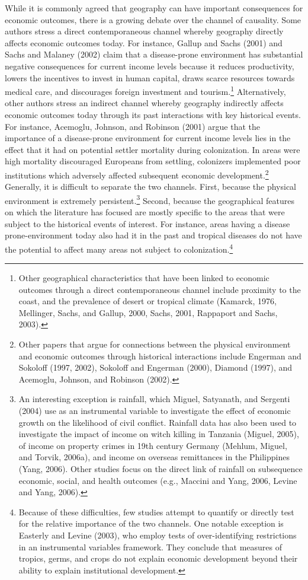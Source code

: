 \documentclass[
  letterpaper,
  DIV=11,
  numbers=noendperiod]{scrartcl}
\begin{document}
While it is commonly agreed that geography can have important
consequences for economic outcomes, there is a growing debate over the
channel of causality. Some authors stress a direct contemporaneous
channel whereby geography directly affects economic outcomes today. For
instance, Gallup and Sachs (2001) and Sachs and Malaney (2002) claim
that a disease-prone environment has substantial negative consequences
for current income levels because it reduces productivity, lowers the
incentives to invest in human capital, draws scarce resources towards
medical care, and discourages foreign investment and tourism.\footnote{Other
  geographical characteristics that have been linked to economic
  outcomes through a direct contemporaneous channel include proximity to
  the coast, and the prevalence of desert or tropical climate (Kamarck,
  1976, Mellinger, Sachs, and Gallup, 2000, Sachs, 2001, Rappaport and
  Sachs, 2003).} Alternatively, other authors stress an indirect channel
whereby geography indirectly affects economic outcomes today through its
past interactions with key historical events. For instance, Acemoglu,
Johnson, and Robinson (2001) argue that the importance of a
disease-prone environment for current income levels lies in the effect
that it had on potential settler mortality during colonization. In areas
were high mortality discouraged Europeans from settling, colonizers
implemented poor institutions which adversely affected subsequent
economic development.\footnote{Other papers that argue for connections
  between the physical environment and economic outcomes through
  historical interactions include Engerman and Sokoloff (1997, 2002),
  Sokoloff and Engerman (2000), Diamond (1997), and Acemoglu, Johnson,
  and Robinson (2002).} Generally, it is difficult to separate the two
channels. First, because the physical environment is extremely
persistent.\footnote{An interesting exception is rainfall, which Miguel,
  Satyanath, and Sergenti (2004) use as an instrumental variable to
  investigate the effect of economic growth on the likelihood of civil
  conflict. Rainfall data has also been used to investigate the impact
  of income on witch killing in Tanzania (Miguel, 2005), of income on
  property crimes in 19th century Germany (Mehlum, Miguel, and Torvik,
  2006a), and income on overseas remittances in the Philippines (Yang,
  2006). Other studies focus on the direct link of rainfall on
  subsequence economic, social, and health outcomes (e.g., Maccini and
  Yang, 2006, Levine and Yang, 2006).} Second, because the geographical
features on which the literature has focused are mostly specific to the
areas that were subject to the historical events of interest. For
instance, areas having a disease prone-environment today also had it in
the past and tropical diseases do not have the potential to affect many
areas not subject to colonization.\footnote{Because of these
  difficulties, few studies attempt to quantify or directly test for the
  relative importance of the two channels. One notable exception is
  Easterly and Levine (2003), who employ tests of over-identifying
  restrictions in an instrumental variables framework. They conclude
  that measures of tropics, germs, and crops do not explain economic
  development beyond their ability to explain institutional development.}
\end{document}
